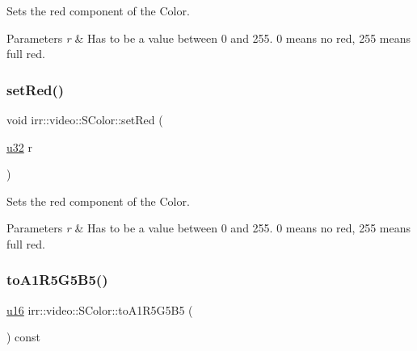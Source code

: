 Sets the red component of the Color. 


\begin{DoxyParams}{Parameters}
{\em r} & Has to be a value between 0 and 255. 0 means no red, 255 means full red. \\
\hline
\end{DoxyParams}
\mbox{\label{classirr_1_1video_1_1SColor_a950c98714711ae9dd8c5219f83c07693}} 
\subsubsection{\texorpdfstring{set\+Red()}{setRed()}\hspace{0.1cm}{\footnotesize\ttfamily [2/2]}}
{\footnotesize\ttfamily void irr\+::video\+::\+S\+Color\+::set\+Red (\begin{DoxyParamCaption}\item[{\hyperlink{namespaceirr_a0416a53257075833e7002efd0a18e804}{u32}}]{r }\end{DoxyParamCaption})\hspace{0.3cm}{\ttfamily [inline]}}



Sets the red component of the Color. 


\begin{DoxyParams}{Parameters}
{\em r} & Has to be a value between 0 and 255. 0 means no red, 255 means full red. \\
\hline
\end{DoxyParams}
\mbox{\label{classirr_1_1video_1_1SColor_aaa60619bb953ba3fd472b0193eda558e}} 
\subsubsection{\texorpdfstring{to\+A1\+R5\+G5\+B5()}{toA1R5G5B5()}\hspace{0.1cm}{\footnotesize\ttfamily [1/2]}}
{\footnotesize\ttfamily \hyperlink{namespaceirr_ae9f8ec82692ad3b83c21f555bfa70bcc}{u16} irr\+::video\+::\+S\+Color\+::to\+A1\+R5\+G5\+B5 (\begin{DoxyParamCaption}{ }\end{DoxyParamCaption}) const\hspace{0.3cm}{\ttfamily [inline]}}




